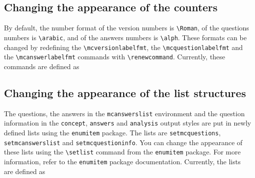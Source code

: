 \documentclass{article}
\begin{document}
  
  

  
\subsection{Changing the appearance of the counters}\label{section:counterformats}

By default, the number format of the version numbers is \verb$\Roman$, of the questions numbers is \verb$\arabic$, and of the answers numbers is \verb$\alph$. These formats can be changed by redefining the \verb$\mcversionlabelfmt$, the \verb$\mcquestionlabelfmt$ and the \verb$\mcanswerlabelfmt$ commands with \verb$\renewcommand$. Currently, these commands are defined as 
\begin{code}
\newcommand\mcversionlabelfmt[1]{\Roman{#1}} 
\newcommand\mcquestionlabelfmt[1]{\arabic{#1}}
\newcommand\mcanswerlabelfmt[1]{(\alph{#1})}
\end{code}  
  
  
  

  
  
\subsection{Changing the appearance of the list structures}

The questions, the answers in the \verb$mcanswerslist$ environment and the question information in the \verb$concept$, \verb$answers$ and \verb$analysis$ output styles are put in newly defined lists using the \verb$enumitem$ package. The lists are \verb$setmcquestions$, \verb$setmcanswerslist$ and \verb$setmcquestioninfo$. You can change the appearance of these lists using the \verb$\setlist$ command from the \verb$enumitem$ package. For more information, refer to the \verb$enumitem$ package documentation. Currently, the lists are defined as
\begin{code}
\end{code}
\end{document}
